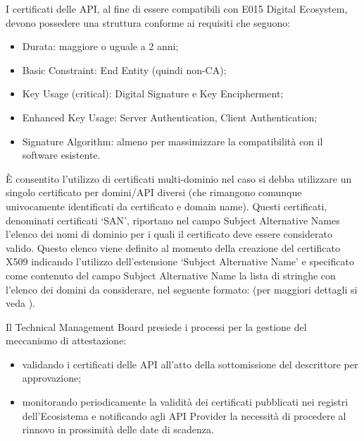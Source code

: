 \documentclass[letterpaper,10pt,italian]{sphinxmanual}
\begin{document}
I certificati delle API, al fine di essere compatibili con E015 Digital Ecosystem, devono possedere una struttura conforme ai requisiti che seguono:
\begin{itemize}
\item {} 
Durata: maggiore o uguale a 2 anni;

\item {} 
Basic Constraint: End Entity (quindi non-CA);

\item {} 
Key Usage (critical): Digital Signature e Key Encipherment;

\item {} 
Enhanced Key Usage: Server Authentication, Client Authentication;

\item {} 
Signature Algorithm: almeno  per massimizzare la compatibilità con il software esistente.

\end{itemize}

È consentito l’utilizzo di certificati multi-dominio  nel caso si debba utilizzare un singolo certificato per  domini/API diversi (che rimangono comunque univocamente identificati da certificato e domain name). Questi certificati, denominati certificati ‘SAN’, riportano nel campo Subject Alternative Names l’elenco dei nomi di dominio per i quali il certificato deve essere considerato valido. Questo elenco viene definito al momento della creazione del certificato X509 indicando l’utilizzo dell’estensione ‘Subject Alternative Name’ e specificato come contenuto del campo Subject Alternative Name la lista di stringhe con l’elenco dei domini da considerare, nel seguente formato:    (per maggiori dettagli si veda ).

Il Technical Management Board presiede i processi per la gestione del meccanismo di attestazione:
\begin{itemize}
\item {} 
validando i certificati delle API all’atto della sottomissione del descrittore per approvazione;

\item {} 
monitorando periodicamente la validità dei certificati pubblicati nei registri dell’Ecosistema e notificando agli API Provider la necessità di procedere al rinnovo in prossimità delle date di scadenza.

\end{itemize}
\end{document}
